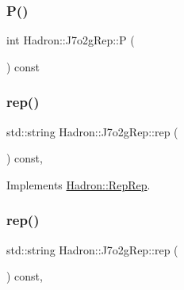 \mbox{\label{structHadron_1_1J7o2gRep_a62e4c7ff9d219d3d00fa5cd6ee9612d1}} 
\subsubsection{\texorpdfstring{P()}{P()}\hspace{0.1cm}{\footnotesize\ttfamily [2/2]}}
{\footnotesize\ttfamily int Hadron\+::\+J7o2g\+Rep\+::P (\begin{DoxyParamCaption}{ }\end{DoxyParamCaption}) const\hspace{0.3cm}{\ttfamily [inline]}}

\mbox{\label{structHadron_1_1J7o2gRep_a77d8605eefc2eb9ae91df0e231d4593b}} 
\subsubsection{\texorpdfstring{rep()}{rep()}\hspace{0.1cm}{\footnotesize\ttfamily [1/2]}}
{\footnotesize\ttfamily std\+::string Hadron\+::\+J7o2g\+Rep\+::rep (\begin{DoxyParamCaption}{ }\end{DoxyParamCaption}) const\hspace{0.3cm}{\ttfamily [inline]}, {\ttfamily [virtual]}}



Implements \mbox{\hyperlink{structHadron_1_1RepRep_ab3213025f6de249f7095892109575fde}{Hadron\+::\+Rep\+Rep}}.

\mbox{\label{structHadron_1_1J7o2gRep_a77d8605eefc2eb9ae91df0e231d4593b}} 
\subsubsection{\texorpdfstring{rep()}{rep()}\hspace{0.1cm}{\footnotesize\ttfamily [2/2]}}
{\footnotesize\ttfamily std\+::string Hadron\+::\+J7o2g\+Rep\+::rep (\begin{DoxyParamCaption}{ }\end{DoxyParamCaption}) const\hspace{0.3cm}{\ttfamily [inline]}, {\ttfamily [virtual]}}



